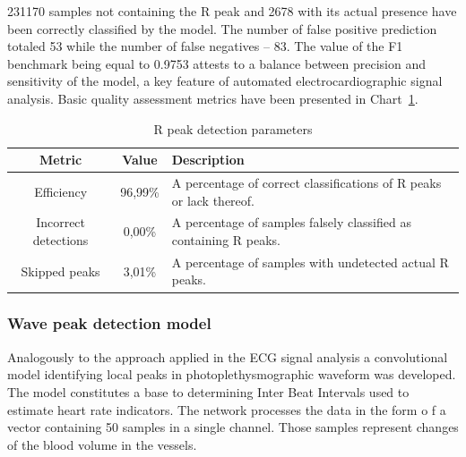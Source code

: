 \documentclass[journal]{IEEEtran}
\begin{document}
231170 samples not containing the R peak and 2678 with its actual presence have been correctly classified by the model. The number of false positive prediction totaled 53 while the  number of false negatives -- 83. The value of the F1 benchmark being equal to 0.9753 attests to a balance between precision and sensitivity of the model, a key feature of automated electrocardiographic signal analysis. Basic quality assessment metrics have been presented in Chart~\ref{tab:metrics}.

\begin{table}[ht]
\centering
\caption{R peak detection parameters}
\label{tab:metrics}
\begin{tabular}{|c|c|p{4.6cm}|}
\hline
\textbf{Metric} & \textbf{Value} & \textbf{Description} \\
\hline
Efficiency & 96,99\% & A percentage of correct classifications of R peaks or lack thereof. \\
Incorrect detections & 0,00\% & A percentage of samples falsely classified as containing R peaks. \\
Skipped peaks & 3,01\% & A percentage of samples with undetected actual R peaks. \\
\hline
\end{tabular}
\end{table}

\subsubsection{Wave peak detection model}
Analogously to the approach applied in the ECG signal analysis a convolutional model identifying local peaks in photoplethysmographic waveform was developed. The model constitutes a base to determining Inter Beat Intervals used to estimate heart rate indicators. The network processes the data in the form o f a vector containing 50 samples in a single channel. Those samples represent changes of the blood volume in the vessels.
\end{document}
